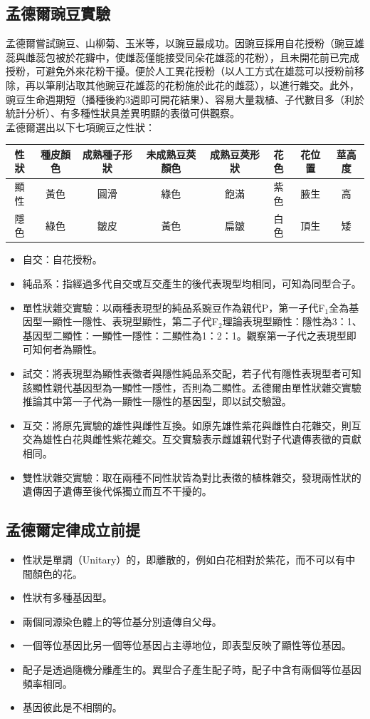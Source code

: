 \documentclass[a4paper,12pt]{report}
\begin{document}
\subsection{孟德爾豌豆實驗}
孟德爾嘗試豌豆、山柳菊、玉米等，以豌豆最成功。因豌豆採用自花授粉（豌豆雄蕊與雌蕊包被於花瓣中，使雌蕊僅能接受同朵花雄蕊的花粉），且未開花前已完成授粉，可避免外來花粉干擾。便於人工異花授粉（以人工方式在雄蕊可以授粉前移除，再以筆刷沾取其他豌豆花雄蕊的花粉施於此花的雌蕊），以進行雜交。此外，豌豆生命週期短（播種後約3週即可開花結果）、容易大量栽植、子代數目多（利於統計分析）、有多種性狀具差異明顯的表徵可供觀察。\\
孟德爾選出以下七項豌豆之性狀：
\begin{longtable}[c]{|c|c|c|c|c|c|c|c|}
\hline
性狀 & 種皮顏色 & 成熟種子形狀 & 未成熟豆莢顏色 & 成熟豆莢形狀 & 花色 & 花位置 & 莖高度 \\ \hline 
顯性 & 黃色 & 圓滑 & 綠色 & 飽滿 & 紫色 & 腋生 & 高 \\ \hline 
隱色 & 綠色 & 皺皮 & 黃色 & 扁皺 & 白色 & 頂生 & 矮 \\ \hline
\end{longtable}
\begin{itemize}
\item 自交：自花授粉。
\item 純品系：指經過多代自交或互交產生的後代表現型均相同，可知為同型合子。
\item 單性狀雜交實驗：以兩種表現型的純品系豌豆作為親代P，第一子代F$_1$全為基因型一顯性一隱性、表現型顯性，第二子代F$_2$理論表現型顯性：隱性為3：1、基因型二顯性：一顯性一隱性：二顯性為1：2：1。觀察第一子代之表現型即可知何者為顯性。
\item 試交：將表現型為顯性表徵者與隱性純品系交配，若子代有隱性表現型者可知該顯性親代基因型為一顯性一隱性，否則為二顯性。孟德爾由單性狀雜交實驗推論其中第一子代為一顯性一隱性的基因型，即以試交驗證。
\item 互交：將原先實驗的雄性與雌性互換。如原先雄性紫花與雌性白花雜交，則互交為雄性白花與雌性紫花雜交。互交實驗表示雌雄親代對子代遺傳表徵的貢獻相同。
\item 雙性狀雜交實驗：取在兩種不同性狀皆為對比表徵的植株雜交，發現兩性狀的遺傳因子遺傳至後代係獨立而互不干擾的。
\end{itemize}
\subsection{孟德爾定律成立前提}
\begin{itemize}
\item 性狀是單調（Unitary）的，即離散的，例如白花相對於紫花，而不可以有中間顏色的花。
\item 性狀有多種基因型。
\item 兩個同源染色體上的等位基分別遺傳自父母。
\item 一個等位基因比另一個等位基因占主導地位，即表型反映了顯性等位基因。
\item 配子是透過隨機分離產生的。異型合子產生配子時，配子中含有兩個等位基因頻率相同。
\item 基因彼此是不相關的。
\end{itemize}
\end{document}
